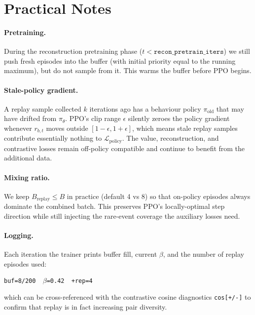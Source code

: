 \documentclass[11pt]{article}
\begin{document}
\section{Practical Notes}

\paragraph{Pretraining.}
During the reconstruction pretraining phase
($t < \texttt{recon\_pretrain\_iters}$) we still push fresh episodes
into the buffer (with initial priority equal to the running maximum),
but do not sample from it. This warms the buffer before PPO begins.

\paragraph{Stale-policy gradient.}
A replay sample collected $k$ iterations ago has a behaviour policy
$\pi_{\text{old}}$ that may have drifted from $\pi_{\theta}$. PPO's
clip range $\epsilon$ silently zeroes the policy gradient whenever
$r_{b,t}$ moves outside $[1-\epsilon, 1+\epsilon]$, which means stale
replay samples contribute essentially nothing to
$\mathcal{L}_{\text{policy}}$. The value, reconstruction, and
contrastive losses remain off-policy compatible and continue to
benefit from the additional data.

\paragraph{Mixing ratio.}
We keep $B_{\text{replay}} \leq B$ in practice (default 4 vs 8) so
that on-policy episodes always dominate the combined batch. This
preserves PPO's locally-optimal step direction while still injecting
the rare-event coverage the auxiliary losses need.

\paragraph{Logging.}
Each iteration the trainer prints buffer fill, current $\beta$, and
the number of replay episodes used:
\begin{center}\texttt{buf=8/200\ \ \(\beta\)=0.42\ \ +rep=4}\end{center}
which can be cross-referenced with the contrastive cosine
diagnostics \texttt{cos[+/-]} to confirm that replay is in fact
increasing pair diversity.
\end{document}
